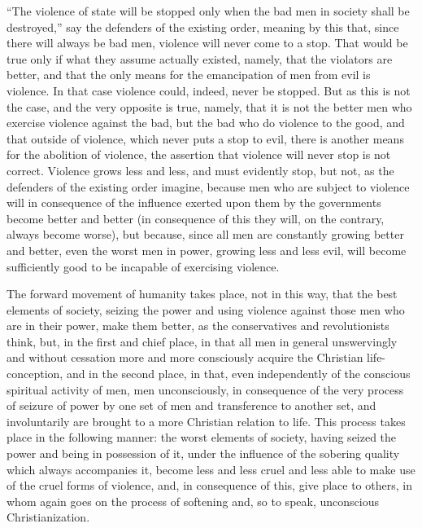 \documentclass{book}
\begin{document}
“The violence of state will be stopped only when the bad men in society shall be destroyed,” say the defenders of the existing order, meaning by this that, since there will always be bad men, violence will never come to a stop. That would be true only if what they assume actually existed, namely, that the violators are better, and that the only means for the emancipation of men from evil is violence. In that case violence could, indeed, never be stopped. But as this is not the case, and the very opposite is true, namely, that it is not the better men who exercise violence against the bad, but the bad who do violence to the good, and that outside of violence, which never puts a stop to evil, there is another means for the abolition of violence, the assertion that violence will never stop is not correct. Violence grows less and less, and must evidently stop, but not, as the defenders of the existing order imagine, because men who are subject to violence will in consequence of the influence exerted upon them by the governments become better and better (in consequence of this they will, on the contrary, always become worse), but because, since all men are constantly growing better and better, even the worst men in power, growing less and less evil, will become sufficiently good to be incapable of exercising violence.

The forward movement of humanity takes place, not in this way, that the best elements of society, seizing the power and using violence against those men who are in their power, make them better, as the conservatives and revolutionists think, but, in the first and chief place, in that all men in general unswervingly and without cessation more and more consciously acquire the Christian life-conception, and in the second place, in that, even independently of the conscious spiritual activity of men, men unconsciously, in consequence of the very process of seizure of power by one set of men and transference to another set, and involuntarily are brought to a more Christian relation to life. This process takes place in the following manner: the worst elements of society, having seized the power and being in possession of it, under the influence of the sobering quality which always accompanies it, become less and less cruel and less able to make use of the cruel forms of violence, and, in consequence of this, give place to others, in whom again goes on the process of softening and, so to speak, unconscious Christianization.
\end{document}
